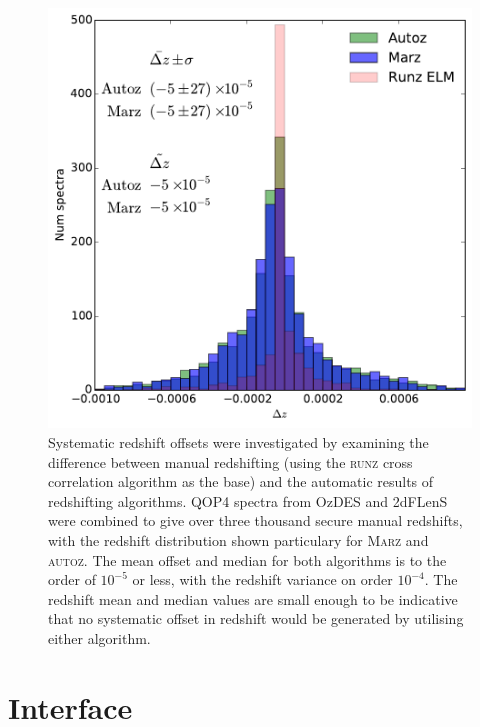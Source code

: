 \documentclass[5p]{elsarticle}
\newcommand{\runz}{\textsc{runz}}
\newcommand{\autoz}{\textsc{autoz}}
\newcommand{\marz}{\textsc{Marz}}
\begin{document}
\clearpage

\begin{figure}[h]
\centering
\includegraphics[width=\columnwidth]{systematic.pdf}
\caption{Systematic redshift offsets were investigated by examining the difference between manual redshifting (using the \runz{} cross correlation algorithm as the base) and the automatic results of redshifting algorithms. QOP4 spectra from OzDES and 2dFLenS were combined to give over three thousand secure manual redshifts, with the redshift distribution shown particulary for \marz{} and \autoz{}. The mean offset and median for both algorithms is to the order of $10^{-5}$ or less, with the redshift variance on order $10^{-4}$. The redshift mean and median values are small enough to be indicative that no systematic offset in redshift would be generated by utilising either algorithm.}
\label{fig:systematic}
\end{figure}














\section{Interface} \label{sec:interface}
\end{document}

